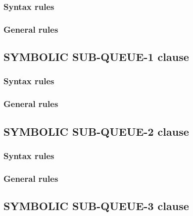 \subsubsection{Syntax rules}

\subsubsection{General rules}

\subsection{SYMBOLIC SUB-QUEUE-1 clause}

\begin{syntax}[\deletedcolour]
\end{syntax}

\subsubsection{Syntax rules}

\subsubsection{General rules}

\subsection{SYMBOLIC SUB-QUEUE-2 clause}

\begin{syntax}[\deletedcolour]
\end{syntax}

\subsubsection{Syntax rules}

\subsubsection{General rules}

\subsection{SYMBOLIC SUB-QUEUE-3 clause}

\begin{syntax}[\deletedcolour]
\end{syntax}

